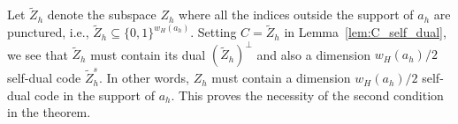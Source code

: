 \documentclass[twoside,romanappendices]{IEEEtran}
\begin{document}
Let $\tilde{Z}_h$ denote the subspace $Z_h$ where all the indices outside the support of $a_h$ are punctured, i.e., $\tilde{Z}_h \subseteq \{ 0,1 \}^{w_H(a_h)}$.
Setting $C = \tilde{Z}_h$ in Lemma~\ref{lem:C_self_dual}, we see that $\tilde{Z}_h$ must contain its dual $(\tilde{Z}_h)^{\perp}$ and also a dimension $w_H(a_h)/2$ self-dual code $\tilde{Z}_h^s$.
In other words, $Z_h$ must contain a dimension $w_H(a_h)/2$ self-dual code in the support of $a_h$.
This proves the necessity of the second condition in the theorem.
\end{document}
